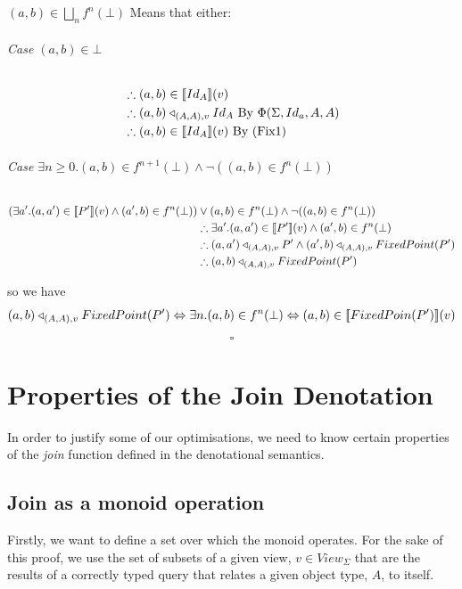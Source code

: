 \documentclass[12pt,a4paper,twoside,openright]{report}
\newcommand\mathName[1]{\textit{#1}}
\newcommand{\db}[1]{{\bf [\![}#1{\bf ]\!]}}
\newcommand{\deno}[1]{\db{#1}(v)}
\newcommand{\denoRule}[2]{#1 \in \deno{#2}}
\newcommand{\opRule}[3]{#1 \triangleleft_{#2, v} #3}
\newcommand{\phiRule}[3]{\Phi(\Sigma, #1, #2, #3)}
\begin{document}
$(a, b) \in \bigsqcup_n f^n(\bot)$ Means that either:

\subparagraph{Case $(a, b) \in \bot$}
\begin{equation}
\label{Case Bottom}
\begin{split}
& \therefore \denoRule{(a,b)}{Id_A}\\
& \therefore \opRule{(a,b)}{(A, A)}{Id_A} \mbox{ By $\phiRule{Id_a}{A}{A}$}\\
& \therefore \denoRule{(a,b)}{Id_A} \mbox{ By (Fix1)}
\end{split}
\end{equation}

\subparagraph{Case $\exists n \geq 0. (a, b) \in f^{n+1}(\bot) \wedge \neg ((a, b) \in f^n(\bot))$}
\begin{equation}
\label{Case n+1}
\begin{split}
(\exists a'. \denoRule{(a, a')}{P'} \wedge (a', b) \in f^{n}(\bot)) & \vee (a, b) \in f^{n}(\bot) \wedge \neg ((a, b) \in f^n(\bot))\\
&\therefore \exists a'. \denoRule{(a, a')}{P'} \wedge (a', b) \in f^{n}(\bot)\\
&\therefore \opRule{(a, a')}{(A, A)}{P'} \wedge \opRule{(a', b)}{(A, A)}{FixedPoint(P')}\\
&\therefore \opRule{(a,b)}{(A,A)}{FixedPoint(P')}
\end{split}
\end{equation}

so we have \[\opRule{(a, b)}{(A, A)}{FixedPoint(P')} \Leftrightarrow \exists n. (a, b) \in f^n(\bot) \Leftrightarrow \denoRule{(a, b)}{FixedPoin(P')}\]

$$\square$$

\chapter{Properties of the Join Denotation}
\label{MonoidJoins}

In order to justify some of our optimisations, we need to know certain properties of the \mathName{join} function defined in the denotational semantics. 

\section{Join as a monoid operation}
Firstly, we want to define a set over which the monoid operates. For the sake of this proof, we use the set of subsets of a given view, $v \in View_{\Sigma}$ that are the results of a correctly typed query that relates a given object type, $A$, to itself.
\end{document}

